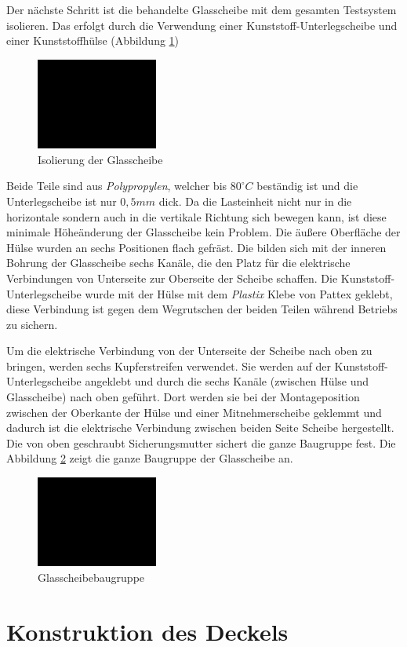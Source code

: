 Der nächste Schritt ist die behandelte Glasscheibe mit dem gesamten Testsystem isolieren.
Das erfolgt durch die Verwendung einer Kunststoff-Unterlegscheibe und einer Kunststoffhülse (Abbildung \ref{fig:isolierung_der_glassscheibe})
\begin{figure}[htb]
    \centering
    \includegraphics[width=4cm]{./images/blank_img.jpg}
    \caption{Isolierung der Glasscheibe}
    \label{fig:isolierung_der_glassscheibe}
\end{figure}
%

Beide Teile sind aus \textit{Polypropylen}, welcher bis $80 ^\circ C$ beständig ist und die Unterlegscheibe ist nur $0,5 mm$ dick.
Da die Lasteinheit nicht nur in die horizontale sondern auch in die vertikale Richtung sich bewegen kann, ist diese minimale Höheänderung der Glasscheibe kein Problem.
Die äußere Oberfläche der Hülse wurden an sechs Positionen flach gefräst. Die bilden sich mit der inneren Bohrung der Glasscheibe sechs Kanäle, die den Platz für die elektrische Verbindungen von Unterseite zur Oberseite der Scheibe schaffen.
Die Kunststoff-Unterlegscheibe wurde mit der Hülse mit dem \textit{Plastix} Klebe von Pattex geklebt, diese Verbindung ist gegen dem Wegrutschen der beiden Teilen während Betriebs zu sichern.

Um die elektrische Verbindung von der Unterseite der Scheibe nach oben zu bringen, werden sechs Kupferstreifen verwendet.
Sie werden auf der Kunststoff-Unterlegscheibe angeklebt und durch die sechs Kanäle (zwischen Hülse und Glasscheibe) nach oben geführt.
Dort werden sie bei der Montageposition zwischen der Oberkante der Hülse und einer Mitnehmerscheibe geklemmt und dadurch ist die elektrische Verbindung zwischen beiden Seite Scheibe hergestellt.
Die von oben geschraubt Sicherungsmutter sichert die ganze Baugruppe fest.
Die Abbildung \ref{fig:glasscheibebaugruppe} zeigt die ganze Baugruppe der Glasscheibe an.
\begin{figure}[htb]
    \centering
    \includegraphics[width=4cm]{./images/blank_img.jpg}
    \caption{Glasscheibebaugruppe}
    \label{fig:glasscheibebaugruppe}
\end{figure}
%

\section{Konstruktion des Deckels}
\label{sec:konstruktion_des_deckels}
